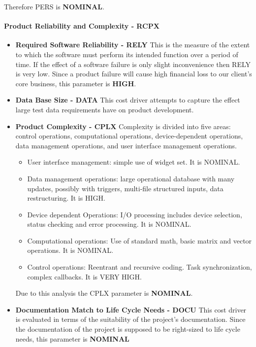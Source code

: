 Therefore PERS is \textbf{NOMINAL}.

\paragraph{Product Reliability and Complexity - RCPX}
\begin{itemize}
	\item \textbf{Required Software Reliability - RELY} This is the measure of the extent to which the software must perform its intended function over a period of time. If the effect of a software failure is only slight inconvenience then RELY is very low. Since a product failure will cause high financial loss to our client's core business, this parameter is \textbf{HIGH}.
	\item \textbf{Data Base Size - DATA} This cost driver attempts to capture the effect large test data requirements have on product development. 
	\item \textbf{Product Complexity - CPLX} Complexity is divided into five areas: control operations, computational operations, device-dependent operations, data management operations, and user interface management operations.
	\begin{itemize}
		\item User interface management: simple use of widget set. It is NOMINAL.
		\item Data management operations: large operational database with many updates, possibly with triggers, multi-file structured inputs, data restructuring. It is HIGH.
		\item Device dependent Operations: I/O processing includes device selection, status checking and error processing. It is NOMINAL.
		\item Computational operations: Use of standard math, basic matrix and vector operations. It is NOMINAL.
		\item Control operations: Reentrant and recursive coding. Task synchronization, complex callbacks. It is VERY HIGH.
	\end{itemize}
	Due to this analysis the CPLX parameter is \textbf{NOMINAL}.
	\item \textbf{Documentation Match to Life Cycle Needs - DOCU} This cost driver is evaluated in terms of the suitability
of the project's documentation. Since the documentation of the project is supposed to be right-sized to life cycle needs, this parameter is \textbf{NOMINAL}
\end{itemize}

